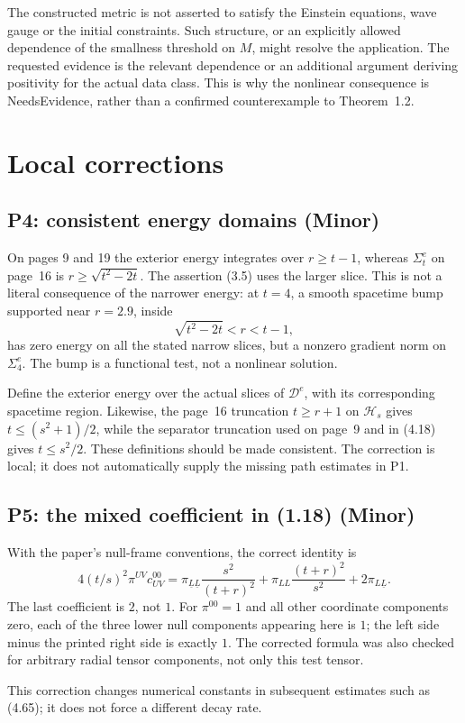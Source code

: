 \documentclass[10pt]{article}
\begin{document}
The constructed metric is not asserted to satisfy the Einstein equations, wave gauge or the initial constraints. Such structure, or an explicitly allowed dependence of the smallness threshold on \(M\), might resolve the application. The requested evidence is the relevant dependence or an additional argument deriving positivity for the actual data class. This is why the nonlinear consequence is NeedsEvidence, rather than a confirmed counterexample to Theorem 1.2.\par
\section*{Local corrections}
\subsection*{P4: consistent energy domains (Minor)}
On pages 9 and 19 the exterior energy integrates over \(r\geq t-1\), whereas \(\Sigma_t^e\) on page 16 is \(r\geq\sqrt{t^2-2t}\). The assertion (3.5) uses the larger slice. This is not a literal consequence of the narrower energy: at \(t=4\), a smooth spacetime bump supported near \(r=2.9\), inside \[\sqrt{t^2-2t}<r<t-1,\] has zero energy on all the stated narrow slices, but a nonzero gradient norm on \(\Sigma_4^e\). The bump is a functional test, not a nonlinear solution.\par
Define the exterior energy over the actual slices of \(\mathcal D^e\), with its corresponding spacetime region. Likewise, the page 16 truncation \(t\geq r+1\) on \(\mathcal H_s\) gives \(t\leq(s^2+1)/2\), while the separator truncation used on page 9 and in (4.18) gives \(t\leq s^2/2\). These definitions should be made consistent. The correction is local; it does not automatically supply the missing path estimates in P1.\par
\subsection*{P5: the mixed coefficient in (1.18) (Minor)}
With the paper’s null-frame conventions, the correct identity is \[4(t/s)^2\pi^{UV}c^{00}_{UV}
 =\pi_{\underline L\underline L}\frac{s^2}{(t+r)^2}
  +\pi_{LL}\frac{(t+r)^2}{s^2}
  +2\pi_{L\underline L}.\] The last coefficient is \(2\), not \(1\). For \(\pi^{00}=1\) and all other coordinate components zero, each of the three lower null components appearing here is \(1\); the left side minus the printed right side is exactly \(1\). The corrected formula was also checked for arbitrary radial tensor components, not only this test tensor.\par
This correction changes numerical constants in subsequent estimates such as (4.65); it does not force a different decay rate.\par
\end{document}
